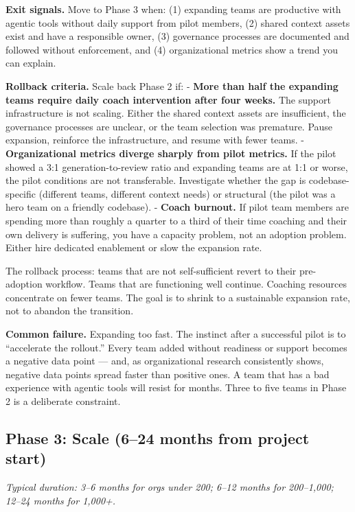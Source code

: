 \documentclass[
  a4paper,
  DIV=11,
  numbers=noendperiod]{scrreprt}
\begin{document}
\textbf{Exit signals.} Move to Phase 3 when: (1) expanding teams are
productive with agentic tools without daily support from pilot members,
(2) shared context assets exist and have a responsible owner, (3)
governance processes are documented and followed without enforcement,
and (4) organizational metrics show a trend you can explain.

\textbf{Rollback criteria.} Scale back Phase 2 if: - \textbf{More than
half the expanding teams require daily coach intervention after four
weeks.} The support infrastructure is not scaling. Either the shared
context assets are insufficient, the governance processes are unclear,
or the team selection was premature. Pause expansion, reinforce the
infrastructure, and resume with fewer teams. - \textbf{Organizational
metrics diverge sharply from pilot metrics.} If the pilot showed a 3:1
generation-to-review ratio and expanding teams are at 1:1 or worse, the
pilot conditions are not transferable. Investigate whether the gap is
codebase-specific (different teams, different context needs) or
structural (the pilot was a hero team on a friendly codebase). -
\textbf{Coach burnout.} If pilot team members are spending more than
roughly a quarter to a third of their time coaching and their own
delivery is suffering, you have a capacity problem, not an adoption
problem. Either hire dedicated enablement or slow the expansion rate.

The rollback process: teams that are not self-sufficient revert to their
pre-adoption workflow. Teams that are functioning well continue.
Coaching resources concentrate on fewer teams. The goal is to shrink to
a sustainable expansion rate, not to abandon the transition.

\textbf{Common failure.} Expanding too fast. The instinct after a
successful pilot is to ``accelerate the rollout.'' Every team added
without readiness or support becomes a negative data point --- and, as
organizational research consistently shows, negative data points spread
faster than positive ones. A team that has a bad experience with agentic
tools will resist for months. Three to five teams in Phase 2 is a
deliberate constraint.

\subsection{Phase 3: Scale (6--24 months from project
start)}\label{phase-3-scale-624-months-from-project-start}

\emph{Typical duration: 3--6 months for orgs under 200; 6--12 months for
200--1,000; 12--24 months for 1,000+.}
\end{document}
